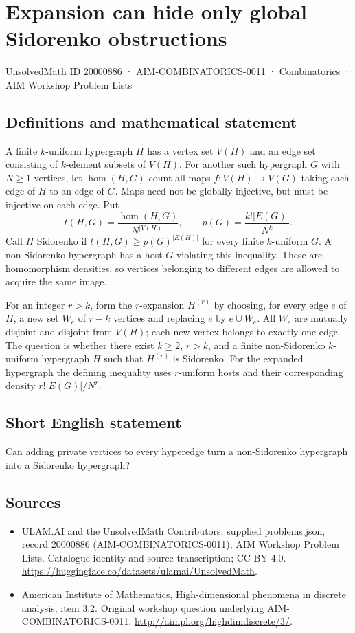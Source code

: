 \documentclass[11pt,a4paper]{article}
\begin{document}
\section*{Expansion can hide only global Sidorenko obstructions}\label{20000886}
{\small UnsolvedMath ID 20000886 · AIM-COMBINATORICS-0011 · Combinatorics · AIM Workshop Problem Lists}
\subsection{Definitions and mathematical statement}
A finite $k$-uniform hypergraph $H$ has a vertex set $V(H)$ and an edge
set consisting of $k$-element subsets of $V(H)$. For another such
hypergraph $G$ with $N\ge1$ vertices, let $\operatorname{hom}(H,G)$ count
all maps $f:V(H)\to V(G)$ taking each edge of $H$ to an edge of $G$.
Maps need not be globally injective, but must be injective on each edge.
Put
\[
 t(H,G)=\frac{\operatorname{hom}(H,G)}{N^{|V(H)|}},\qquad
 p(G)=\frac{k!|E(G)|}{N^k}.
\]
Call $H$ Sidorenko if $t(H,G)\ge p(G)^{|E(H)|}$ for every finite
$k$-uniform $G$. A non-Sidorenko hypergraph has a host $G$ violating this
inequality. These are homomorphism densities, so vertices belonging to
different edges are allowed to acquire the same image.

For an integer $r>k$, form the $r$-expansion $H^{(r)}$ by choosing,
for every edge $e$ of $H$, a new set $W_e$ of $r-k$ vertices and replacing
$e$ by $e\cup W_e$. All $W_e$ are mutually disjoint and disjoint from
$V(H)$; each new vertex belongs to exactly one edge.
The question is whether there exist $k\ge2$, $r>k$, and a finite
non-Sidorenko $k$-uniform hypergraph $H$ such that $H^{(r)}$ is Sidorenko.
For the expanded hypergraph the defining inequality uses $r$-uniform
hosts and their corresponding density $r!|E(G)|/N^r$.
\subsection{Short English statement}
Can adding private vertices to every hyperedge turn a non-Sidorenko hypergraph into a Sidorenko hypergraph?
\subsection{Sources}
\begin{itemize}
\item[S1] ULAM.AI and the UnsolvedMath Contributors, supplied problems.json, record 20000886 (AIM-COMBINATORICS-0011), AIM Workshop Problem Lists. Catalogue identity and source transcription; CC BY 4.0.
\url{https://huggingface.co/datasets/ulamai/UnsolvedMath}.
\item[S2] American Institute of Mathematics, High-dimensional phenomena in discrete analysis, item 3.2. Original workshop question underlying AIM-COMBINATORICS-0011.
\url{http://aimpl.org/highdimdiscrete/3/}.
\end{itemize}
\end{document}
